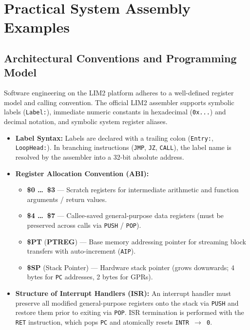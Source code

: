\documentclass[11pt,a4paper]{article}
\begin{document}
\vspace{4mm}
\section{Practical System Assembly Examples}

\subsection{Architectural Conventions and Programming Model}

Software engineering on the LIM2 platform adheres to a well-defined register model and calling convention. The official LIM2 assembler supports symbolic labels (\texttt{Label:}), immediate numeric constants in hexadecimal (\texttt{0x...}) and decimal notation, and symbolic system register aliases.

\begin{archcallout}[title={Basic Rules and Conventions of LIM2 Assembly}]
\begin{itemize}[leftmargin=10pt,itemsep=1.5pt,topsep=2pt,parsep=0pt]
    \item \textbf{Label Syntax:} Labels are declared with a trailing colon (\texttt{Entry:}, \texttt{LoopHead:}). In branching instructions (\texttt{JMP}, \texttt{JZ}, \texttt{CALL}), the label name is resolved by the assembler into a 32-bit absolute address.
    \item \textbf{Register Allocation Convention (ABI):}
    \begin{itemize}[leftmargin=8pt,itemsep=0.5pt,topsep=0.5pt,parsep=0pt]
        \item \textbf{\$0 \dots\ \$3} --- Scratch registers for intermediate arithmetic and function arguments / return values.
        \item \textbf{\$4 \dots\ \$7} --- Callee-saved general-purpose data registers (must be preserved across calls via \texttt{PUSH} / \texttt{POP}).
        \item \textbf{\$PT} (\textbf{PTREG}) --- Base memory addressing pointer for streaming block transfers with auto-increment (\texttt{AIP}).
        \item \textbf{\$SP} (Stack Pointer) --- Hardware stack pointer (grows downwards; 4 bytes for \texttt{PC} addresses, 2 bytes for GPRs).
    \end{itemize}
    \item \textbf{Structure of Interrupt Handlers (ISR):} An interrupt handler must preserve all modified general-purpose registers onto the stack via \texttt{PUSH} and restore them prior to exiting via \texttt{POP}. ISR termination is performed with the \texttt{RET} instruction, which pops \texttt{PC} and atomically resets \texttt{INTR \(\to\) 0}.
\end{itemize}
\end{archcallout}
\end{document}
